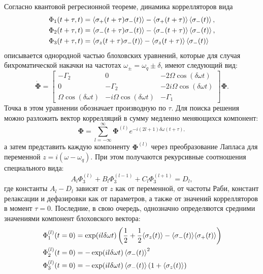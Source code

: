 Согласно квантовой регресионной теореме, динамика коррелляторов вида
\begin{equation}\label{eq: corrs_dyn}
\begin{split}
\Phi_1(t+\tau, t) &= \braket{\sigma_+(t+\tau)\sigma_-(t)} -  \braket{\sigma_+(t+\tau)}\braket{\sigma_-(t)},\\
\Phi_2(t+\tau, t) &= \braket{\sigma_-(t+\tau)\sigma_-(t)} -  \braket{\sigma_-(t+\tau)}\braket{\sigma_-(t)},\\
\Phi_3(t+\tau, t) &= \braket{\sigma_z(t+\tau)\sigma_-(t)} -  \braket{\sigma_z(t+\tau)}\braket{\sigma_-(t)}\\
\end{split}
\end{equation}
описывается однородной частью блоховских уравнений, которые для случая бихроматической накачки на частотах $\omega_\pm = \omega_q \pm \delta$, имеют следующий вид:
\begin{equation}\label{eq: bloch_corr}
\dot{\mathbf{\Phi}} = \left[\begin{matrix}- \Gamma_2 & 0 & - 2\Omega \cos{\left(\delta\omega t \right)}\\0 & - \Gamma_2 & - 2i \Omega \cos{\left(\delta\omega t \right)}\\ \Omega \cos{\left(\delta\omega t \right)} & -  i \Omega \cos{\left(\delta\omega t \right)} & - \Gamma_1
\end{matrix}\right]\mathbf{\Phi}.
\end{equation}
Точка в этом уравнении обозначает производную по $\tau$.
Для поиска решения можно разложить вектор коррелляций в сумму медленно меняющихся компонент:
\begin{equation}\label{eq: floquet}
\mathbf{\Phi} = \sum_{l=-\infty}^{\infty}\mathbf{\Phi}^{(l)}e^{-i(2l+1)\delta\omega (t+\tau),}
\end{equation}
а затем представить каждую компоненту $\mathbf{\Phi}^{(l)}$ через преобразование Лапласа для переменной $z=i(\omega-\omega_q)$. При этом получаются рекурсивные соотношения специального вида:
\begin{equation}\label{eq: corr_rec}
A_l\Phi^{(l)}_3+B_l\Phi^{(l-1)}_3 + C_l\Phi_3 ^{(l+1)} = D_l,
\end{equation}
где константы $A_l-D_l$ зависят от $z$ как от переменной, от частоты Раби, констант релаксации и дефазировки как от параметров, а также от значений коррелляторов в момент $\tau=0$. Последние, в свою очередь, однозначно определяются средними значениями компонент блоховского вектора:
\begin{equation}
\begin{split}
\Phi_1^{(l)}(t=0) &= \exp(il\delta\omega t)\left(\frac{1}{2}+\frac{1}{2}\!\braket{\sigma_z(t)} - \braket{\sigma_-(t)}\!\braket{\sigma_+(t)}\right) \\
\Phi_2^{(l)}(t=0) &= -\exp(il\delta\omega t)\braket{\sigma_-(t)}^2 \\
\Phi_3^{(l)}(t=0) &= -\exp(il\delta\omega t)\braket{\sigma_-(t)}\left(1+\braket{\sigma_z(t)}\right) \\
\end{split}
\end{equation}
